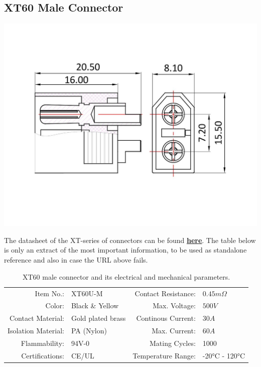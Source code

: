 \clearpage %

\subsection{XT60 Male Connector}

\includegraphics[width=\textwidth]{contents/figures/xt60_m.jpg}

The datasheet of the XT-series of connectors can be found \href{https://www.lcsc.com/datasheet/lcsc_datasheet_1810251312_Changzhou-Amass-Elec-XT60U-M_C129184.pdf}{\textbf{\underline{here}}}.
The table below is only an extract of the most important information, to be used as standalone reference and also in case the URL above fails.

\begin{table}[h] %
    \begin{tabular}{rlrl}
         Item No.:&  XT60U-M &  Contact Resistance:& $0.45m \Omega$\\
         Color:&  Black \& Yellow&  Max. Voltage:& $500V$\\
         Contact Material:&  Gold plated brass&  Continous Current:& $30A$\\
         Isolation Material:&  PA (Nylon)&  Max. Current:& $60A$\\
         Flammability:&  94V-0&  Mating Cycles:& 1000\\
         Certifications:&  CE/UL&  Temperature Range:& -20°C - 120°C\\
    \end{tabular}
    \caption{XT60 male connector and its electrical and mechanical parameters.}
    \label{xt60_f_specs}
\end{table}

